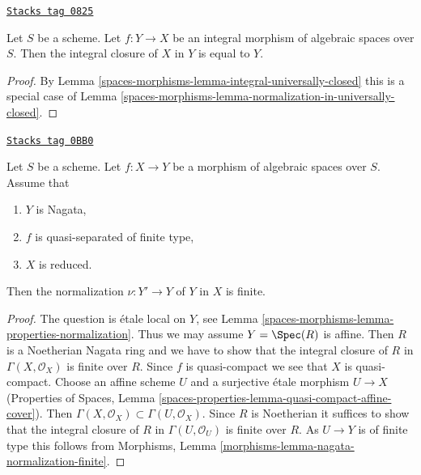 \begin{lemma}
\label{spaces-morphisms-lemma-normalization-in-integral}
\href{https://stacks.math.columbia.edu/tag/0825}{\texttt{Stacks tag 0825}}

Let $S$ be a scheme. Let $f : Y \to X$ be an integral morphism
of algebraic spaces over $S$.
Then the integral closure of $X$ in $Y$ is equal to $Y$.
\end{lemma}

\begin{proof}
By Lemma \ref{spaces-morphisms-lemma-integral-universally-closed} this is a special case of
Lemma \ref{spaces-morphisms-lemma-normalization-in-universally-closed}.
\end{proof}

\begin{lemma}
\label{spaces-morphisms-lemma-nagata-normalization-finite}
\href{https://stacks.math.columbia.edu/tag/0BB0}{\texttt{Stacks tag 0BB0}}

Let $S$ be a scheme. Let $f : X \to Y$ be a morphism of algebraic spaces
over $S$. Assume that
\begin{enumerate}
\item $Y$ is Nagata,
\item $f$ is quasi-separated of finite type,
\item $X$ is reduced.
\end{enumerate}
Then the normalization $\nu : Y' \to Y$ of $Y$ in $X$ is finite.
\end{lemma}

\begin{proof}
The question is \'etale local on $Y$, see
Lemma \ref{spaces-morphisms-lemma-properties-normalization}.
Thus we may assume $Y = \Spec(R)$ is affine.
Then $R$ is a Noetherian Nagata ring
and we have to show that the integral closure of
$R$ in $\Gamma(X, \mathcal{O}_X)$ is finite over $R$.
Since $f$ is quasi-compact we see that $X$ is quasi-compact.
Choose an affine scheme $U$ and a surjective \'etale
morphism $U \to X$ (Properties of Spaces, Lemma
\ref{spaces-properties-lemma-quasi-compact-affine-cover}).
Then $\Gamma(X, \mathcal{O}_X) \subset \Gamma(U, \mathcal{O}_X)$.
Since $R$ is Noetherian it suffices to show that
the integral closure of $R$ in $\Gamma(U, \mathcal{O}_U)$
is finite over $R$. As $U \to Y$ is of finite type
this follows from
Morphisms, Lemma \ref{morphisms-lemma-nagata-normalization-finite}.
\end{proof}


